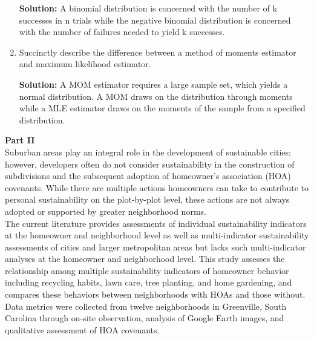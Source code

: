 \documentclass{article}
\begin{document}
\begin{enumerate}
    \begin{minipage}[t][1.15in][t]{\textwidth}
    \textbf{Solution:} A binomial distribution is concerned with the number of k successes in n trials while the negative binomial distribution is concerned with the number of failures needed to yield k successes. 
    \end{minipage}
  \item Succinctly describe the difference between a method of moments estimator
  and maximum likelihood estimator.\\
    \begin{minipage}[t][1.15in][t]{\textwidth}
    \textbf{Solution:} A MOM estimator requires a large sample set, which yields a normal distribution. A MOM draws on the distribution through moments while a MLE estimator draws on the moments of the sample from a specified distribution.
    \end{minipage}
\end{enumerate}

\newpage
\textbf{Part II}\\
Suburban areas play an integral role in the development of sustainable cities; however, developers often do not consider sustainability in the construction of subdivisions and the subsequent adoption of homeowner's association (HOA) covenants. While there are multiple actions homeowners can take to contribute to personal sustainability on the plot-by-plot level, these actions are not always adopted or supported by greater neighborhood norms. \\

The current literature provides assessments of individual sustainability indicators at the homeowner and neighborhood level as well as multi-indicator sustainability assessments of cities and larger metropolitan areas but lacks such multi-indicator analyses at the homeowner and neighborhood level. This study assesses the relationship among multiple sustainability indicators of homeowner behavior including recycling habits, lawn care, tree planting, and home gardening, and compares these behaviors between neighborhoods with HOAs and those without. Data metrics were collected from twelve neighborhoods in Greenville, South Carolina through on-site observation, analysis of Google Earth images, and qualitative assessment of HOA covenants.\\
\end{document}
